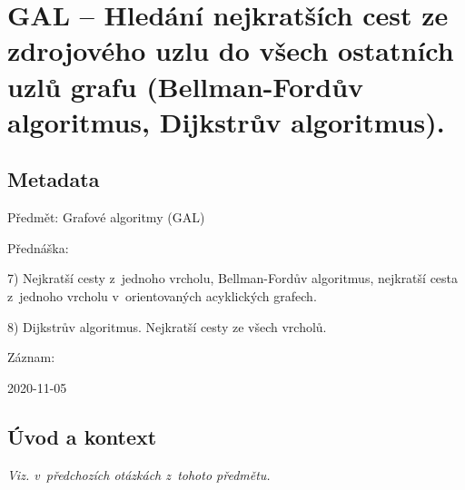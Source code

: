 

\graphicspath{{gal/hledani_nejkratsich_cest/figures}}


\chapter{GAL -- Hledání nejkratších cest ze zdrojového uzlu do všech ostatních uzlů grafu (Bellman-Fordův algoritmus, Dijkstrův algoritmus).}


\section{Metadata}

\begin{compactitem}
    \item Předmět: Grafové algoritmy (GAL)
    \item Přednáška:
    \begin{compactitem}
        \item 7) Nejkratší cesty z~jednoho vrcholu, Bellman-Fordův algoritmus, nejkratší cesta z~jednoho vrcholu v~orientovaných acyklických grafech.
        \item 8) Dijkstrův algoritmus. Nejkratší cesty ze všech vrcholů.
    \end{compactitem}
    \item Záznam:
    \begin{compactitem}
        \item 2020-11-05
    \end{compactitem}
\end{compactitem}


\section{Úvod a kontext}

\textit{Viz.  v~předchozích otázkách z~tohoto předmětu.}

